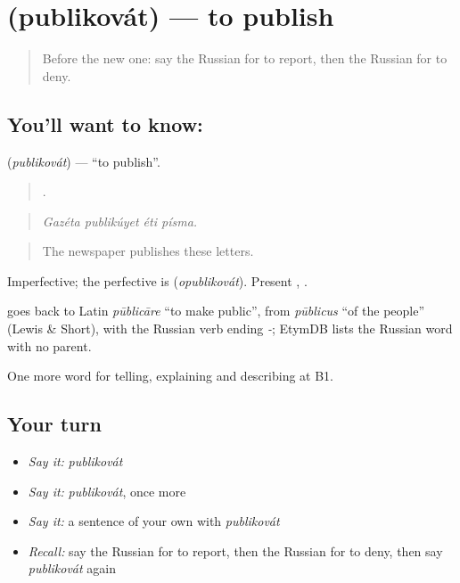 \section[\texorpdfstring{\ru{публиковать} (publikovát)}{публиковать (publikovát)}]{ (publikovát) — to publish}

\label{lesson:RU-C280-publikovat}



\begin{quote}
Before the new one: say the Russian for to report, then the Russian for to deny.
\end{quote}

\subsection*{You'll want to know: }
\textbf{} (\emph{publikovát}) — \textquotedblleft{}to publish\textquotedblright{}.

\begin{quote}
   .
\end{quote}

\begin{quote}
\emph{Gazéta publikúyet éti písma.}
\end{quote}

\begin{quote}
The newspaper publishes these letters.
\end{quote}

Imperfective; the perfective is \emph{} (\emph{opublikovát}). Present \emph{}, \emph{}.

\begin{cousinweb}
\emph{} goes back to Latin \emph{pūblicāre} \textquotedblleft{}to make public\textquotedblright{}, from \emph{pūblicus} \textquotedblleft{}of the people\textquotedblright{} (Lewis \& Short), with the Russian verb ending \emph{-}; EtymDB lists the Russian word with no parent.
\end{cousinweb}

\begin{grammarlens}[title={What you've built}]
One more word for telling, explaining and describing at B1.
\end{grammarlens}

\subsection*{Your turn}
\begin{itemize}
\raggedright
  \item \emph{Say it:} \emph{publikovát}
  \item \emph{Say it:} \emph{publikovát}, once more
  \item \emph{Say it:} a sentence of your own with \emph{publikovát}
  \item \emph{Recall:} say the Russian for to report, then the Russian for to deny, then say \emph{publikovát} again
\end{itemize}

